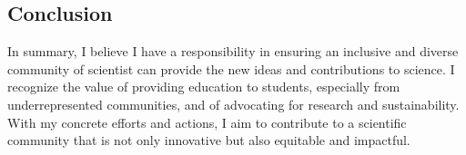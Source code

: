 {\begin{flushleft}
\vspace{\baselineskip}
\section{Conclusion}
\vspace{\baselineskip}
In summary, I believe I have a responsibility in ensuring an inclusive and diverse community of scientist can provide the new ideas and contributions to science. I recognize the value of providing education to students, especially from underrepresented communities, and of advocating for research and sustainability. With my concrete efforts and actions, I aim to contribute to a scientific community that is not only innovative but also equitable and impactful.

\end{flushleft}
}
